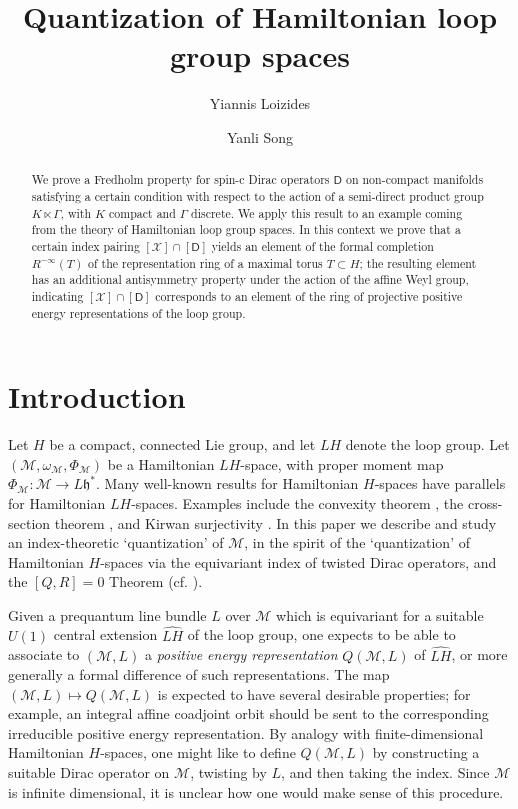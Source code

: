\documentclass[11pt,reqno]{amsart}
\theoremstyle{definition}
\theoremstyle{remark}
\newcommand{\wh}[1]{\widehat{#1}}
\newcommand{\st}[1]{\mathsf{#1}}
\def\h{\ensuremath{\mathfrak{h}}}
\def\X{\ensuremath{\mathcal{X}}}
\def\M{\ensuremath{\mathcal{M}}}
\begin{document}
\sloppy
\title{Quantization of Hamiltonian loop group spaces}
\author{Yiannis Loizides}
\author{Yanli Song}

\begin{abstract}
We prove a Fredholm property for spin-c Dirac operators $\st{D}$ on non-compact manifolds satisfying a certain condition with respect to the action of a semi-direct product group $K\ltimes \Gamma$, with $K$ compact and $\Gamma$ discrete.  We apply this result to an example coming from the theory of Hamiltonian loop group spaces.  In this context we prove that a certain index pairing $[\X] \cap [\st{D}]$ yields an element of the formal completion $R^{-\infty}(T)$ of the representation ring of a maximal torus $T \subset H$; the resulting element has an additional antisymmetry property under the action of the affine Weyl group, indicating $[\X] \cap [\st{D}]$ corresponds to an element of the ring of projective positive energy representations of the loop group.
\end{abstract}
\maketitle
\vspace{-0.5cm}

\section{Introduction}
Let $H$ be a compact, connected Lie group, and let $LH$ denote the loop group.  Let $(\M,\omega_{\M},\Phi_{\M})$ be a Hamiltonian $LH$-space, with proper moment map $\Phi_{\M} \colon \M \rightarrow L\h^\ast$.  Many well-known results for Hamiltonian $H$-spaces have parallels for Hamiltonian $LH$-spaces.  Examples include the convexity theorem \cite{MWVerlindeFactorization}, the cross-section theorem \cite{MWVerlindeFactorization}, and Kirwan surjectivity \cite{BottTolmanWeitsman}.  In this paper we describe and study an index-theoretic `quantization' of $\M$, in the spirit of the `quantization' of Hamiltonian $H$-spaces via the equivariant index of twisted Dirac operators, and the ${[Q,R]=0}$ Theorem (cf. \cite{GuilleminSternbergConjecture,MeinrenkenSymplecticSurgery,TianZhang,
ParadanRiemannRoch,ParadanVergneSpinc,HochsSongSpinc}).

Given a prequantum line bundle $L$ over $\M$ which is equivariant for a suitable $U(1)$ central extension $\wh{LH}$ of the loop group, one expects to be able to associate to $(\M,L)$ a \emph{positive energy representation} $Q(\M,L)$ of $\wh{LH}$, or more generally a formal difference of such representations.  The map $(\M,L) \mapsto Q(\M,L)$ is expected to have several desirable properties; for example, an integral affine coadjoint orbit should be sent to the corresponding irreducible positive energy representation.  By analogy with finite-dimensional Hamiltonian $H$-spaces, one might like to define $Q(\M,L)$ by constructing a suitable Dirac operator on $\M$, twisting by $L$, and then taking the index.  Since $\M$ is infinite dimensional, it is unclear how one would make sense of this procedure. 
\end{document}
